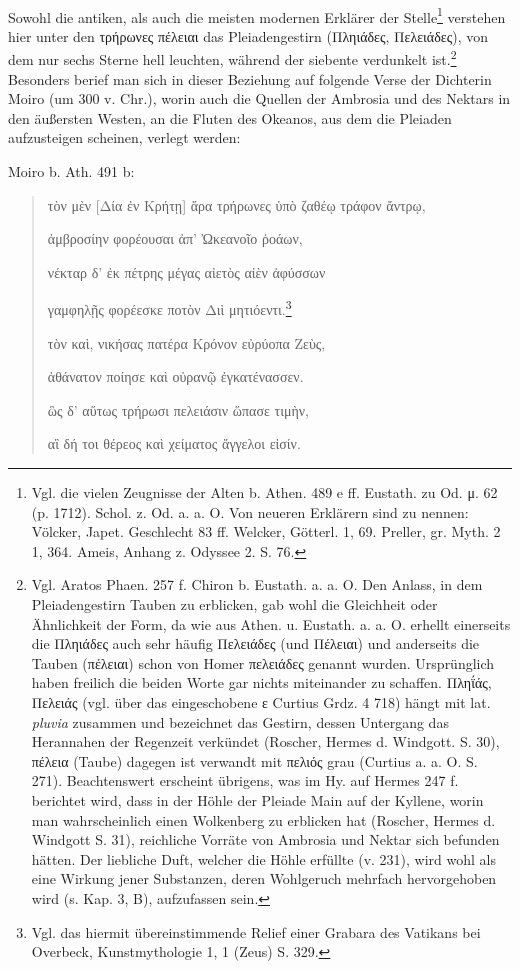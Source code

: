 \documentclass[a4paper, 11pt, oneside]{article}
\begin{document}
\paragraph{}
Sowohl die antiken, als auch die meisten modernen Erklärer der Stelle\footnote{Vgl. die vielen Zeugnisse der Alten b. Athen. 489 e ff. Eustath. zu Od. μ. 62 (p. 1712). Schol. z. Od. a. a. O. Von neueren Erklärern sind zu nennen: Völcker, Japet. Geschlecht 83 ff. Welcker, Götterl. 1, 69. Preller, gr. Myth. 2 1, 364. Ameis, Anhang z. Odyssee 2. S. 76.} verstehen hier unter den τρήρωνες πέλειαι das Pleiadengestirn (Πληιάδες, Πελειάδες), von dem nur sechs Sterne hell leuchten, während der siebente verdunkelt ist.\footnote{Vgl. Aratos Phaen. 257 f. Chiron b. Eustath. a. a. O. Den Anlass, in dem Pleiadengestirn Tauben zu erblicken, gab wohl die Gleichheit oder Ähnlichkeit der Form, da wie aus Athen. u. Eustath. a. a. O. erhellt einerseits die Πληιάδες auch sehr häufig Πελειάδες (und Πέλειαι) und anderseits die Tauben (πέλειαι) schon von Homer πελειάδες genannt wurden. Ursprünglich haben freilich die beiden Worte gar nichts miteinander zu schaffen. Πληΐάς, Πελειάς (vgl. über das eingeschobene ε Curtius Grdz. 4 718) hängt mit lat. \emph{pluvia} zusammen und bezeichnet das Gestirn, dessen Untergang das Herannahen der Regenzeit verkündet (Roscher, Hermes d. Windgott. S. 30), πέλεια (Taube) dagegen ist verwandt mit πελιός grau (Curtius a. a. O. S. 271). Beachtenswert erscheint übrigens, was im Hy. auf Hermes 247 f. berichtet wird, dass in der Höhle der Pleiade Main auf der Kyllene, worin man wahrscheinlich einen Wolkenberg zu erblicken hat (Roscher, Hermes d. Windgott S. 31), reichliche Vorräte von Ambrosia und Nektar sich befunden hätten. Der liebliche Duft, welcher die Höhle erfüllte (v. 231), wird wohl als eine Wirkung jener Substanzen, deren Wohlgeruch mehrfach hervorgehoben wird (s. Kap. 3, B), aufzufassen sein.} Besonders berief man sich in dieser Beziehung auf folgende Verse der Dichterin Moiro (um 300 v. Chr.), worin auch die Quellen der Ambrosia und des Nektars in den äußersten Westen, an die Fluten des Okeanos, aus dem die Pleiaden aufzusteigen scheinen, verlegt werden:

Moiro b. Ath. 491 b:
\begin{quotation}
τὸν μὲν [Δία ἐν Κρήτῃ] ἄρα τρήρωνες ὑπὸ ζαθέῳ τράφον ἄντρῳ,

ἀμβροσίην φορέουσαι ἀπ' Ὠκεανοῖο ῥοάων,

νέκταρ δ' ἐκ πέτρης μέγας αἰετὸς αἰὲν ἀφύσσων

γαμφηλῇς φορέεσκε ποτὸν Διὶ μητιόεντι.\footnote{Vgl. das hiermit übereinstimmende Relief einer Grabara des Vatikans bei Overbeck, Kunstmythologie 1, 1 (Zeus) S. 329.}

\bigskip

τὸν καὶ, νικήσας πατέρα Κρόνον εὐρύοπα Ζεὺς,

ἀθάνατον ποίησε καὶ οὐρανῷ ἐγκατένασσεν.

ὣς δ' αὕτως τρήρωσι πελειάσιν ὥπασε τιμὴν,

αἳ δή τοι θέρεος καὶ χείματος ἄγγελοι εἰσίν.
\end{quotation}
\end{document}
